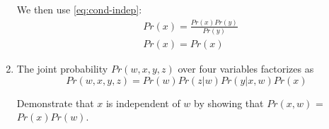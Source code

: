 \documentclass{article}
\begin{document}
\begin{enumerate}
We then use \ref{eq:cond-indep}:
\begin{align*}
	&Pr\left( x \right) = \frac{Pr\left( x \right) Pr(y)}{Pr\left( y \right) } \\
	&Pr\left( x \right) = Pr\left( x \right) 
\end{align*}

\item The joint probability $Pr(w, x, y, z)$ over four variables factorizes as
\begin{equation*}
	Pr\left( w,x,y,z \right) = Pr\left( w \right) Pr\left( z|w \right) Pr\left( y|x, w \right) Pr\left( x \right) 
\end{equation*}

Demonstrate that $x$ is independent of $w$ by showing that $Pr(x, w)$ = $Pr(x)Pr(w)$. \\



\end{enumerate}
\end{document}
